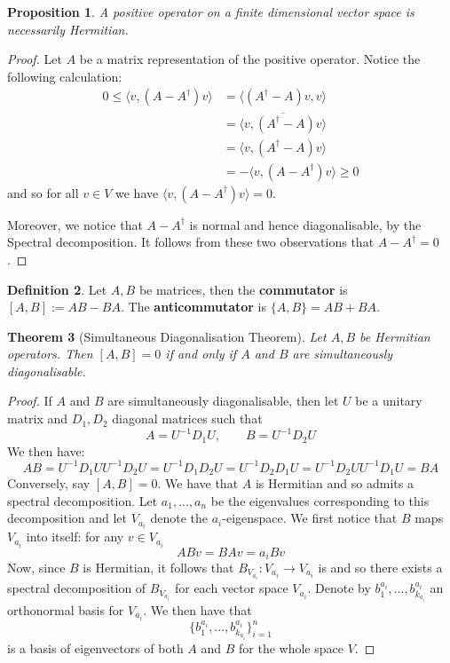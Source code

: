 \documentclass[12pt]{article}
\theoremstyle{plain}
\newtheorem{thm}{Theorem}[subsection] %
\newtheorem{proposition}[thm]{Proposition}
\theoremstyle{definition}
\newtheorem{defn}[thm]{Definition} %
\newcommand{\lto}{\longrightarrow}
\begin{document}
\begin{proposition}
A positive operator on a finite dimensional vector space is necessarily Hermitian.
\end{proposition}
\begin{proof}
Let $A$ be a matrix representation of the positive operator. Notice the following calculation:
\begin{align*}
0 \leq \langle v, (A - A^\dagger)v\rangle &= \langle (A^\dagger - A)v,v\rangle\\
&= \overline{\langle v, (A^\dagger - A)v\rangle}\\
&= \langle v, (A^\dagger - A)v\rangle\\
&= -\langle v, (A - A^\dagger)v\rangle \geq 0
\end{align*}
and so for all $v \in V$ we have $\langle v, (A - A^\dagger)v\rangle = 0$.

Moreover, we notice that $A - A^\dagger$ is normal and hence diagonalisable, by the Spectral decomposition. It follows from these two observations that $A - A^\dagger = 0$.
\end{proof}
\begin{defn}
Let $A,B$ be matrices, then the \textbf{commutator} is $[A,B] := AB - BA$. The \textbf{anticommutator} is $\lbrace A,B \rbrace = AB + BA$.
\end{defn}
\begin{thm}[Simultaneous Diagonalisation Theorem]
Let $A,B$ be Hermitian operators. Then $[A,B] = 0$ if and only if $A$ and $B$ are simultaneously diagonalisable.
\end{thm}
\begin{proof}
If $A$ and $B$ are simultaneously diagonalisable, then let $U$ be a unitary matrix and $D_1,D_2$ diagonal matrices such that
\begin{equation}
A = U^{-1}D_1U,\qquad B = U^{-1}D_2U
\end{equation}
We then have:
\begin{equation}
AB = U^{-1}D_1UU^{-1}D_2U = U^{-1}D_1D_2U = U^{-1}D_2D_1U = U^{-1}D_2UU^{-1}D_1U = BA
\end{equation}
Conversely, say $[A,B] = 0$. We have that $A$ is Hermitian and so admits a spectral decomposition. Let $a_1,...,a_n$ be the eigenvalues corresponding to this decomposition and let $V_{a_i}$ denote the $a_i$-eigenspace. We first notice that $B$ maps $V_{a_i}$ into itself: for any $v \in V_{a_i}$
\begin{equation}
ABv = BAv = a_{i}Bv
\end{equation}
Now, since $B$ is Hermitian, it follows that $B_{V_{a_i}}: V_{a_i} \lto V_{a_i}$ is and so there exists a spectral decomposition of $B_{V_{a_i}}$ for each vector space $V_{a_i}$. Denote by $b_1^{a_i},...,b_{k_{a_i}}^{a_i}$ an orthonormal basis for $V_{a_i}$. We then have that
\begin{equation}
\lbrace b_1^{a_i},...,b_{k_{a_i}}^{a_i}\rbrace_{i = 1}^n
\end{equation}
is a basis of eigenvectors of both $A$ and $B$ for the whole space $V$.
\end{proof}
\end{document}
